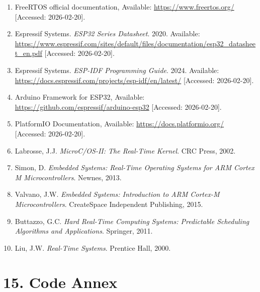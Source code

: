 \documentclass[12pt]{article}
\begin{document}
\begin{enumerate}
    \item FreeRTOS official documentation, Available: \url{https://www.freertos.org/} [Accessed: 2026-02-20].
    
    \item Espressif Systems. \textit{ESP32 Series Datasheet}. 2020. Available: \url{https://www.espressif.com/sites/default/files/documentation/esp32\_datasheet\_en.pdf} [Accessed: 2026-02-20].
    
    \item Espressif Systems. \textit{ESP-IDF Programming Guide}. 2024. Available: \url{https://docs.espressif.com/projects/esp-idf/en/latest/} [Accessed: 2026-02-20].
    
    \item Arduino Framework for ESP32, Available: \url{https://github.com/espressif/arduino-esp32} [Accessed: 2026-02-20].
    
    \item PlatformIO Documentation, Available: \url{https://docs.platformio.org/} [Accessed: 2026-02-20].
    
    \item Labrosse, J.J. \textit{MicroC/OS-II: The Real-Time Kernel}. CRC Press, 2002.
    
    \item Simon, D. \textit{Embedded Systems: Real-Time Operating Systems for ARM Cortex M Microcontrollers}. Newnes, 2013.
    
    \item Valvano, J.W. \textit{Embedded Systems: Introduction to ARM Cortex-M Microcontrollers}. CreateSpace Independent Publishing, 2015.
    
    \item Buttazzo, G.C. \textit{Hard Real-Time Computing Systems: Predictable Scheduling Algorithms and Applications}. Springer, 2011.
    
    \item Liu, J.W. \textit{Real-Time Systems}. Prentice Hall, 2000.
\end{enumerate}

\section*{15. Code Annex}
\end{document}
